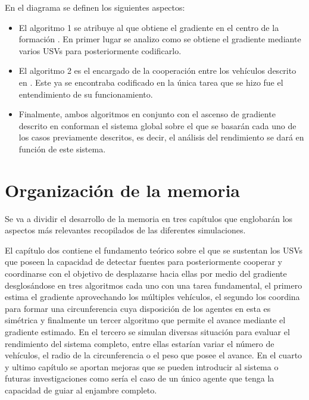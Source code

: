 En el diagrama se definen los siguientes aspectos:

\begin{itemize}
	\item El algoritmo 1 se atribuye al que obtiene el gradiente en el centro de la formación \cite{Estimacion_Gradiente}. En primer lugar se analizo como se obtiene el gradiente mediante varios USVs para posteriormente codificarlo.
	\item El algoritmo 2 es el encargado de la cooperación entre los vehículos descrito en \cite{Control_Formacion}. Este ya se encontraba codificado en \cite{Git_Hector} la única tarea que se hizo fue el entendimiento de su funcionamiento.
	\item Finalmente, ambos algoritmos en conjunto con el ascenso de gradiente descrito en \cite{Adicional_Estimacion_1} conforman el sistema global sobre el que se basarán cada uno de los casos previamente descritos, es decir, el análisis del rendimiento se dará en función de este sistema.
\end{itemize}

\section{Organización de la memoria}

Se va a dividir el desarrollo de la memoria en tres capítulos que englobarán los aspectos más relevantes recopilados de las diferentes simulaciones.

El capítulo dos contiene el fundamento teórico sobre el que se sustentan los USVs que poseen la capacidad de detectar fuentes para posteriormente cooperar y coordinarse con el objetivo de desplazarse hacia ellas por medio del gradiente desglosándose en tres algoritmos cada uno con una tarea fundamental, el primero estima el gradiente aprovechando los múltiples vehículos, el segundo los coordina para formar una circunferencia cuya disposición de los agentes en esta es simétrica y finalmente un tercer algoritmo que permite el avance mediante el gradiente estimado. En el tercero se simulan diversas situación para evaluar el rendimiento del sistema completo, entre ellas estarían variar el número de vehículos, el radio de la circunferencia o el peso que posee el avance. En el cuarto y ultimo capítulo se aportan mejoras que se pueden introducir al sistema o futuras investigaciones como sería el caso de un único agente que tenga la capacidad de guiar al enjambre completo.
